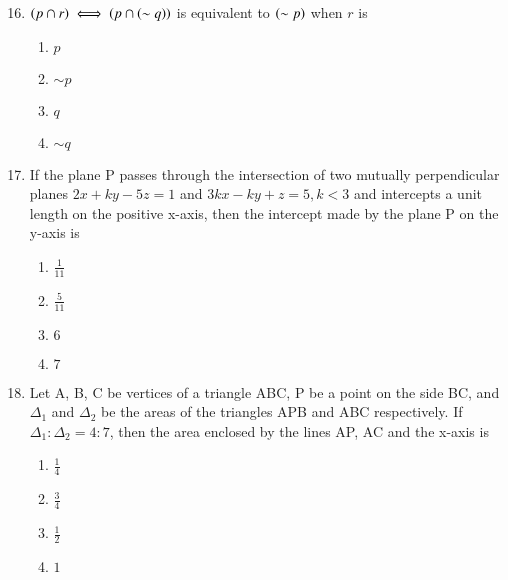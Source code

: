 \documentclass[journal]{IEEEtran}
\begin{document}
\begin{enumerate}
\setcounter{enumi}{15}
 
    \item $\left(p\cap r\right)\iff \left(p\cap\left(\sim q\right)\right)$ is equivalent to $\left(\sim p\right)$ when $r$ is

        \begin{multicols}{4}
            \begin{enumerate}
                \item $p$
                \item $\sim p$
                \item $q$
                \item $\sim q$
            \end{enumerate}
        \end{multicols}

    \item If the plane P passes through the intersection of two mutually perpendicular planes $2x+ky-5z=1$ and $3kx-ky+z=5,k<3$ and intercepts a unit length on the positive x-axis, then the intercept made by the plane P on the y-axis is 

		\begin{multicols}{4}
			\begin{enumerate}
				\item $\frac{1}{11}$
				\item $\frac{5}{11}$
				\item $6$
				\item $7$
			\end{enumerate}
		\end{multicols}

    \item Let A, B, C be vertices of a triangle ABC, P be a point on the side BC, and $\Delta_1$ and $\Delta_2$ be the areas of the triangles APB and ABC respectively. If $\Delta_1:\Delta_2=4:7$, then the area enclosed by the lines AP, AC and the x-axis is

        \begin{multicols}{4}
            \begin{enumerate}
                \item $\frac{1}{4}$
                \item $\frac{3}{4}$
                \item $\frac{1}{2}$
                \item $1$
            \end{enumerate}
        \end{multicols}


\end{enumerate}
\end{document}
